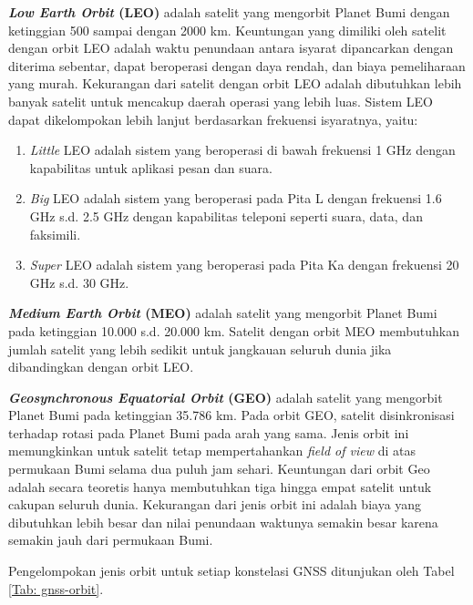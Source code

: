 \textbf{\textit{Low Earth Orbit} (LEO)} adalah satelit yang mengorbit Planet Bumi dengan ketinggian 500 sampai dengan 2000 km. Keuntungan yang dimiliki oleh satelit dengan orbit LEO adalah waktu penundaan antara isyarat dipancarkan dengan diterima sebentar, dapat beroperasi dengan daya rendah, dan biaya pemeliharaan yang murah. Kekurangan dari satelit dengan orbit LEO adalah dibutuhkan lebih banyak satelit untuk mencakup daerah operasi yang lebih luas. Sistem LEO dapat dikelompokan lebih lanjut berdasarkan frekuensi isyaratnya, yaitu:
\begin{enumerate}
	\item \textit{Little} LEO adalah sistem yang beroperasi di bawah frekuensi 1 GHz dengan kapabilitas untuk aplikasi pesan dan suara.
	\item \textit{Big} LEO adalah sistem yang beroperasi pada Pita L dengan frekuensi 1.6 GHz s.d. 2.5 GHz dengan kapabilitas teleponi seperti suara, data, dan faksimili.
	\item \textit{Super} LEO adalah sistem yang beroperasi pada Pita Ka dengan frekuensi 20 GHz s.d. 30 GHz.
\end{enumerate}

\textbf{\textit{Medium Earth Orbit} (MEO)} adalah satelit yang mengorbit Planet Bumi pada ketinggian 10.000 s.d. 20.000 km. Satelit dengan orbit MEO membutuhkan jumlah satelit yang lebih sedikit untuk jangkauan seluruh dunia jika dibandingkan dengan orbit LEO.

\textbf{\textit{Geosynchronous Equatorial Orbit} (GEO)} adalah satelit yang mengorbit Planet Bumi pada ketinggian 35.786 km. Pada orbit GEO, satelit disinkronisasi terhadap rotasi pada Planet Bumi pada arah yang sama. Jenis orbit ini memungkinkan untuk satelit tetap mempertahankan \textit{field of view} di atas permukaan Bumi selama dua puluh jam sehari. Keuntungan dari orbit Geo adalah secara teoretis hanya membutuhkan tiga hingga empat satelit untuk cakupan seluruh dunia. Kekurangan dari jenis orbit ini adalah biaya yang dibutuhkan lebih besar dan nilai penundaan waktunya semakin besar karena semakin jauh dari permukaan Bumi.

Pengelompokan jenis orbit untuk setiap konstelasi GNSS ditunjukan oleh Tabel \ref{Tab: gnss-orbit}.

